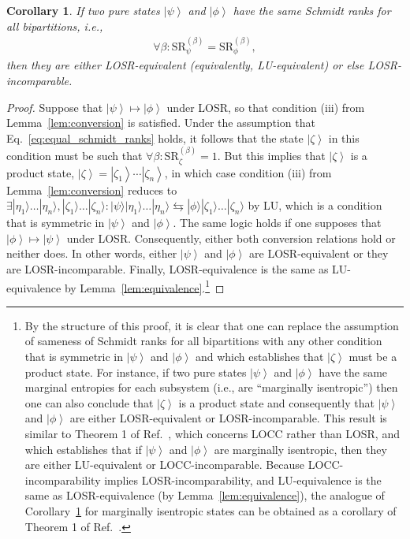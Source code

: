 \documentclass[12pt]{article}
\newcommand{\ket}[1]{\left| #1 \right>}
\theoremstyle{plain}
\newtheorem{cor}[theo]{Corollary}
\theoremstyle{definition}
\begin{document}
    \begin{cor}
        \label{cor:equivalent_or_incomparable}
        If two pure states $\ket{\psi}$ and $\ket{\phi}$ have the same Schmidt ranks for all bipartitions, i.e., 
        \begin{align}
            \label{eq:equal_schmidt_ranks}
            \forall \beta: \mathrm{SR}_{\psi}^{(\beta)} = \mathrm{SR}_{\phi}^{(\beta)},
        \end{align}
        then they are either 
        LOSR-equivalent (equivalently, LU-equivalent)
         or else LOSR-incomparable.
    \end{cor}
    \begin{proof}
Suppose that $\ket{\psi} \mapsto \ket{\phi}$ under LOSR, so that condition (iii) from Lemma~\ref{lem:conversion}
         is satisfied.           Under the assumption that 
        Eq.~\eqref{eq:equal_schmidt_ranks} holds, it follows that the state $\ket{\zeta}$ in this condition must be such that $\forall \beta: \mathrm{SR}_{\zeta}^{(\beta)} = 1$.  But this implies that $\ket{\zeta}$ is a product state, $\ket \zeta = \ket {\zeta_1} \cdots \ket {\zeta_n}$, in which case 
condition (iii) from Lemma~\ref{lem:conversion} reduces to $\exists |\eta_1\rangle \dots |\eta_n\rangle, |\zeta_1\rangle \dots |\zeta_n\rangle : |\psi\rangle |\eta_1\rangle \dots |\eta_n\rangle \leftrightarrows |\phi\rangle |\zeta_1\rangle \dots |\zeta_n\rangle$ by LU,
         which is a condition that is symmetric in $\ket \psi$ and $\ket \phi$.  The same logic holds if one supposes that $\ket{\phi} \mapsto \ket{\psi}$ under LOSR. Consequently, either both conversion relations hold or neither does.  In other words, either $\ket{\psi}$ and $\ket{\phi}$ are LOSR-equivalent  or they are LOSR-incomparable.  Finally, LOSR-equivalence is the same as LU-equivalence by Lemma~\ref{lem:equivalence}.\footnote{By the structure of this proof, it is clear that one can replace the assumption of sameness of Schmidt ranks for all bipartitions with
  any other condition that is symmetric in $\ket \psi$ and $\ket \phi$ and which establishes that $\ket \zeta$ must be a product state. For instance, if two pure states $\ket \psi$ and $\ket \phi$ have the same marginal entropies for each subsystem (i.e., are ``marginally isentropic'') then one can also conclude that $\ket{\zeta}$ is a product state and consequently that $\ket \psi$ and $\ket \phi$ are either LOSR-equivalent or LOSR-incomparable.  This result is similar to Theorem 1 of Ref.~\cite{bennett2000exact}, which concerns LOCC rather than LOSR, and which establishes that if $\ket \psi$ and $\ket \phi$ are marginally isentropic, then they are either LU-equivalent or LOCC-incomparable.   Because LOCC-incomparability implies LOSR-incomparability, and LU-equivalence is the same as LOSR-equivalence (by Lemma~\ref{lem:equivalence}), the analogue of Corollary~\ref{cor:equivalent_or_incomparable} for marginally isentropic states can be obtained as a corollary of Theorem 1 of Ref.~\cite{bennett2000exact}.}
    \end{proof}
\end{document}
